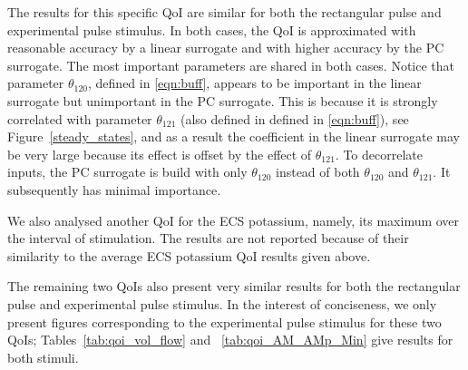 \documentclass[smallextended]{svjour3}
\numberwithin{equation}{section}
\begin{document}
The results for this specific QoI are similar for both the rectangular pulse and experimental pulse stimulus. In both cases, the QoI is approximated with reasonable accuracy by a linear surrogate and with higher accuracy by the PC surrogate. The most important parameters are shared in both cases. Notice that parameter $\theta_{120}$, defined in \eqref{eqn:buff}, appears to be important in the linear surrogate but unimportant in the PC surrogate. This is because it is strongly correlated with parameter $\theta_{121}$ (also defined in defined in \eqref{eqn:buff}), see Figure~\ref{steady_states}, and as a result the coefficient in the linear surrogate may be very large because its effect is offset by the effect of $\theta_{121}$. To decorrelate inputs, the PC surrogate is build with only $\theta_{120}$ instead of both $\theta_{120}$ and $\theta_{121}$. It subsequently has minimal importance.

We also analysed another QoI for the ECS potassium, namely, its maximum over the interval of stimulation. The results are not reported because of their similarity to the average ECS potassium QoI results given above.

The remaining two QoIs also present very similar results for both the rectangular pulse and experimental pulse stimulus. In the interest of conciseness, we only present figures corresponding to the experimental pulse stimulus for these two QoIs; Tables~\ref{tab:qoi_vol_flow} and ~\ref{tab:qoi_AM_AMp_Min} give results for both stimuli. 
\end{document}
